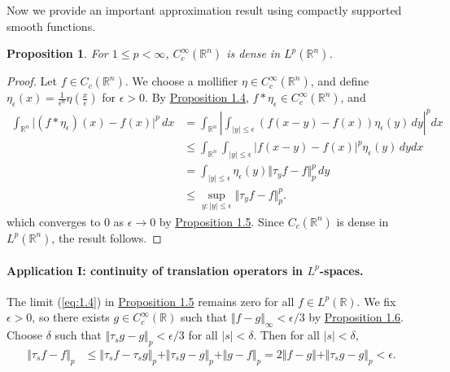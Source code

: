 \documentclass{article}
\numberwithin{equation}{section}
\newcommand{\bbR}{\mathbb{R}}
\theoremstyle{plain}
\newtheorem{proposition}[theorem]{Proposition}
\theoremstyle{definition}
\begin{document}
Now we provide an important approximation result using compactly supported smooth functions.
\begin{proposition}\label{prop:1.6}
For $1\leq p <\infty$, $C_c^\infty(\mathbb{R}^n)$ is dense in $L^p(\mathbb{R}^n)$.
\end{proposition}
\begin{proof}
	Let $f\in C_c(\mathbb{R}^n)$. We choose a mollifier $\eta\in C_c^\infty(\bbR^n)$, and define $\eta_\epsilon(x) = \frac{1}{\epsilon^n}\eta\left(\frac{x}{\epsilon}\right)$ for $\epsilon > 0$. By \hyperref[prop:1.4]{Proposition 1.4}, $f*\eta_\epsilon\in C^\infty_c(\mathbb{R}^n)$, and
	\begin{align*}
		\int_{\bbR^n} \vert(f *\eta_\epsilon)(x) - f(x)\vert^p\,dx &= \int_{\bbR^n}\left\vert\int_{\vert y\vert\leq\epsilon} (f(x-y)-f(x))\eta_\epsilon(y)\,dy\right\vert^p dx\\
		&\leq \int_{\bbR^n}\int_{\vert y\vert\leq\epsilon} \tag{By Jensen's inequality} \left\vert f(x-y)-f(x)\right\vert^p\eta_\epsilon(y)\,dydx\\
		& = \int_{\vert y\vert\leq\epsilon}\eta_\epsilon(y)\Vert\tau_y f -f\Vert_p^p\,dy\\
		&\leq\sup_{y:\vert y\vert\leq\epsilon}\Vert\tau_y f - f\Vert_p^p.
	\end{align*}
	which converges to $0$ as $\epsilon\to 0$ by \hyperref[prop:1.5]{Proposition 1.5}. Since $C_c(\bbR^n)$ is dense in $L^p(\bbR^n)$, the result follows.
\end{proof}

\paragraph{Application I: continuity of translation operators in $L^p$-spaces.} The limit (\ref{eq:1.4}) in \hyperref[prop:1.5]{Proposition 1.5} remains zero for all $f\in L^p(\mathbb{R})$. We fix $\epsilon > 0$, so there exists $g\in C^\infty_c(\mathbb{R})$ such that $\Vert f-g\Vert_\infty < \epsilon/3$ by \hyperref[prop:1.6]{Proposition 1.6}. Choose $\delta$ such that $\Vert\tau_s g -g\Vert_p<\epsilon/3$ for all $\vert s\vert<\delta$. Then for all $\vert s\vert<\delta$,
\begin{align*}
	\Vert \tau_s f - f\Vert_p &\leq \Vert \tau_s f - \tau_s g\Vert_p + \Vert \tau_s g - g\Vert_p + \Vert g - f\Vert_p = 2\Vert f - g\Vert + \Vert\tau_s g -g\Vert_p < \epsilon.
\end{align*}
\end{document}

